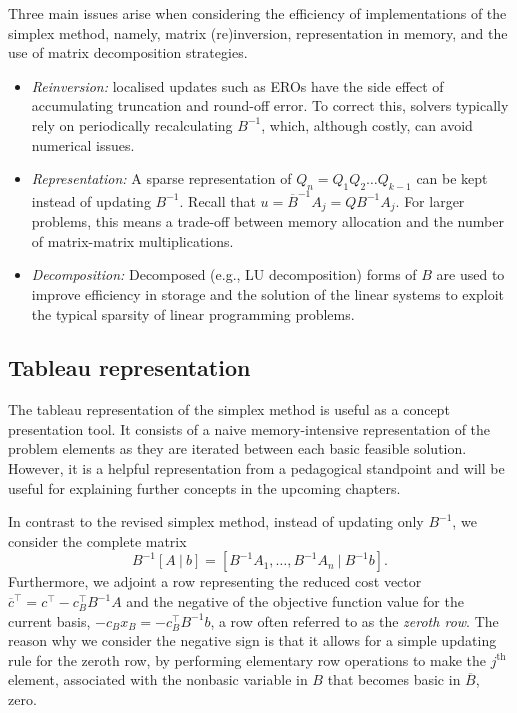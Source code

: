 Three main issues arise when considering the efficiency of implementations of the simplex method, namely, matrix (re)inversion, representation in memory, and the use of matrix decomposition strategies.
%
\begin{itemize}
	\item \emph{Reinversion:} localised updates such as EROs have the side effect of accumulating truncation and round-off error. To correct this, solvers typically rely on periodically recalculating $B^{-1}$, which, although costly, can avoid numerical issues.
	\item \emph{Representation:} A sparse representation of $Q_n = Q_1Q_2 \dots Q_{k-1}$ can be kept instead of updating $B^{-1}$. Recall that $u = \overline{B}^{-1}A_j = QB^{-1}A_j$. For larger problems, this means a trade-off between memory allocation and the number of matrix-matrix multiplications.
	\item \emph{Decomposition:} Decomposed (e.g., LU decomposition) forms of $B$ are used to improve efficiency in storage and the solution of the linear systems to exploit the typical sparsity of linear programming problems.  	
\end{itemize}



\subsection{Tableau representation}

The tableau representation of the simplex method is useful as a concept presentation tool. It consists of a naive memory-intensive representation of the problem elements as they are iterated between each basic feasible solution. However, it is a helpful representation from a pedagogical standpoint and will be useful for explaining further concepts in the upcoming chapters. 

In contrast to the revised simplex method, instead of updating only $B^{-1}$, we consider the complete matrix 
%
\begin{equation*}
	B^{-1}[A ~|~ b] = \left[B^{-1}A_1, \dots, B^{-1}A_n ~|~  B^{-1}b\right].		
\end{equation*}
%
Furthermore, we adjoint a row representing the reduced cost vector $\overline{c}^\top = c^\top - c_B^\top B^{-1}A$ and the negative of the objective function value for the current basis, $ -c_Bx_B = -c_B^\top B^{-1}b$, a row often referred to as the \emph{zeroth row}. The reason why we consider the negative sign is that it allows for a simple updating rule for the zeroth row, by performing elementary row operations to make the $j^\text{th}$ element, associated with the nonbasic variable in $B$ that becomes basic in $\overline{B}$, zero.

